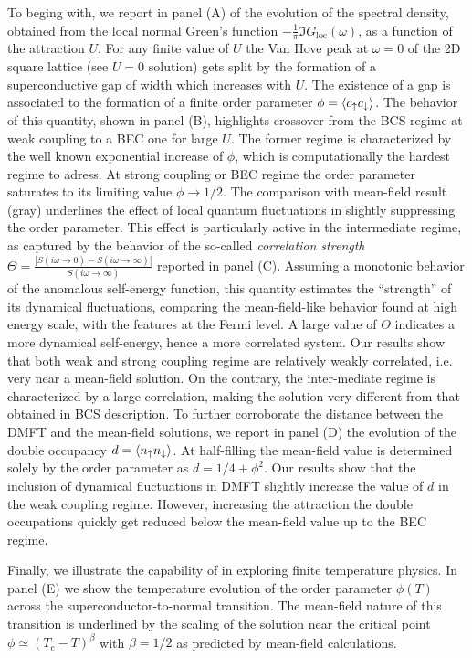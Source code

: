 \documentclass[edipack2.tex]{subfiles}
\begin{document}
To beging with, we report in  panel (A) of  the
evolution of the spectral density, obtained from the local normal
Green's function $-\tfrac{1}{\pi}\Im{G}_\mathrm{loc}(\omega)$, as a function
of the attraction $U$. For any finite value of  $U$ the Van Hove peak
at $\omega=0$ of the 2D square lattice (see $U=0$
solution) gets split by the formation of a superconductive gap of
width which increases with $U$.
The existence of a gap is associated to the formation of a finite
order parameter $\phi=\langle c_\uparrow c_\downarrow\rangle$. The behavior of
this quantity, shown in panel (B), highlights crossover from the BCS
regime at weak coupling to a BEC one for large $U$.
The former regime is characterized by the well known exponential increase of
$\phi$, which is computationally the hardest regime to adress. At
strong coupling or BEC regime the order parameter saturates to its
limiting value $\phi\to 1/2$. The comparison with mean-field result
(gray) underlines the effect of local quantum fluctuations in slightly
suppressing the order parameter. This effect is particularly active in
the intermediate regime, as captured by the behavior of the so-called
\emph{correlation strength}
$\Theta=\frac{|S(i\omega\to 0)-S(i\omega\to\infty)|}{S(i\omega\to\infty)}$
reported in panel (C). Assuming a monotonic behavior of the anomalous
self-energy function, this quantity estimates the ``strength'' of its
dynamical fluctuations, comparing the mean-field-like behavior found
at high energy scale, with the features at the Fermi level. 
A large value of $\Theta$ indicates a more dynamical self-energy, hence
a more correlated system.
Our results show that both weak and strong coupling regime are
relatively weakly correlated, i.e. very near a mean-field solution. On
the contrary, the inter-mediate regime is characterized by a large
correlation, making the solution very different from that obtained in
BCS description.  
To further corroborate the distance between the DMFT and the mean-field
solutions, we report in panel (D) the evolution of the double occupancy
$d=\langle n_\uparrow n_\downarrow\rangle$. At half-filling the mean-field value is
determined solely by the order parameter as $d=1/4 + \phi^2$.
Our results show that the inclusion of dynamical fluctuations in DMFT
slightly increase the value of $d$ in the weak coupling
regime. However, increasing the attraction the double occupations
quickly get reduced below the mean-field value up to the BEC regime.

Finally, we illustrate the capability of \NAME in
exploring finite temperature physics. In panel (E) we show the
temperature evolution of the order parameter $\phi(T)$ across the
superconductor-to-normal transition. The mean-field nature of this
transition is underlined by the scaling of the solution near
the critical point $\phi \simeq (T_\mathrm{c}-T)^\beta$ with $\beta=1/2$ as
predicted by mean-field calculations. 
\end{document}
